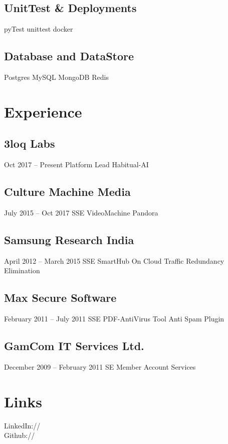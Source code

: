 \documentclass[]{deedy-resume-openfont}
\begin{document}
\begin{minipage}[t]{0.33\textwidth}
\subsection{UnitTest \& Deployments}
pyTest \textbullet{} unittest  \textbullet{}  docker 

\subsection{Database and DataStore}
Postgres \textbullet{} MySQL  \textbullet{}  MongoDB  \textbullet{} Redis

\sectionsep


\section{Experience} 
\subsection{3loq Labs}
Oct 2017 – Present \textbullet{} Platform Lead \textbullet{} Habitual-AI
\subsection{Culture Machine Media}
July 2015 – Oct 2017 \textbullet{} SSE \textbullet{} VideoMachine \textbullet{} Pandora
\subsection{Samsung Research India}
April 2012 – March 2015 \textbullet{} SSE \textbullet{} SmartHub On Cloud \textbullet{} Traffic Redundancy Elimination
\subsection{Max Secure Software}
February 2011 – July 2011 \textbullet{} SSE \textbullet{} PDF-AntiVirus Tool  \textbullet{} Anti Spam Plugin
\subsection{GamCom IT Services Ltd.}
December 2009 – February 2011 \textbullet{} SE \textbullet{} Member Account Services
\sectionsep



\section{Links} 
LinkedIn://  \href{https://www.linkedin.com/in/rohan-pithadiya}{} \\
Github:// \href{https://github.com/Rohanpithadiya}{} \\
\sectionsep

%
%

\end{minipage} 
\end{document}
